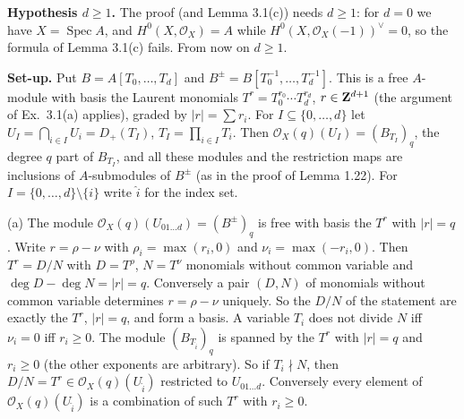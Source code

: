 \documentclass[11pt]{article}
\begin{document}
\pf
\textbf{Hypothesis $d\ge1$.} The proof (and Lemma 3.1(c)) needs $d\ge1$: for $d=0$ we have $X=\operatorname{Spec}A$, and $H^0(X,\mathcal O_X)=A$ while $H^0(X,\mathcal O_X(-1))^\vee=0$, so the formula of Lemma 3.1(c) fails. From now on $d\ge1$.

\textbf{Set-up.} Put $B=A[T_0,\dots,T_d]$ and $B^{\pm}=B[T_0^{-1},\dots,T_d^{-1}]$. This is a free $A$-module with basis the Laurent monomials $T^r=T_0^{r_0}\cdots T_d^{r_d}$, $r\in\mathbf Z^{d+1}$ (the argument of Ex.~3.1(a) applies), graded by $|r|=\sum r_i$. For $I\subseteq\{0,\dots,d\}$ let $U_I=\bigcap_{i\in I}U_i=D_+(T_I)$, $T_I=\prod_{i\in I}T_i$. Then $\mathcal O_X(q)(U_I)=(B_{T_I})_q$, the degree $q$ part of $B_{T_I}$, and all these modules and the restriction maps are inclusions of $A$-submodules of $B^{\pm}$ (as in the proof of Lemma 1.22). For $I=\{0,\dots,d\}\setminus\{i\}$ write $\hat i$ for the index set.

(a) The module $\mathcal O_X(q)(U_{01\dots d})=(B^{\pm})_q$ is free with basis the $T^r$ with $|r|=q$. Write $r=\rho-\nu$ with $\rho_i=\max(r_i,0)$ and $\nu_i=\max(-r_i,0)$. Then $T^r=D/N$ with $D=T^\rho$, $N=T^\nu$ monomials without common variable and $\deg D-\deg N=|r|=q$. Conversely a pair $(D,N)$ of monomials without common variable determines $r=\rho-\nu$ uniquely. So the $D/N$ of the statement are exactly the $T^r$, $|r|=q$, and form a basis. A variable $T_i$ does not divide $N$ iff $\nu_i=0$ iff $r_i\ge0$. The module $(B_{T_{\hat i}})_q$ is spanned by the $T^r$ with $|r|=q$ and $r_i\ge0$ (the other exponents are arbitrary). So if $T_i\nmid N$, then $D/N=T^r\in\mathcal O_X(q)(U_{\hat i})$ restricted to $U_{01\dots d}$. Conversely every element of $\mathcal O_X(q)(U_{\hat i})$ is a combination of such $T^r$ with $r_i\ge0$.
\end{document}
